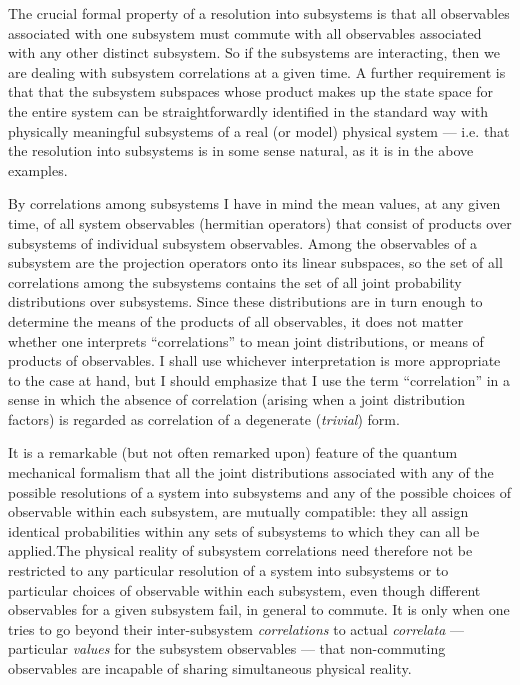 The crucial formal property of a resolution into subsystems is that
all observables associated with one subsystem must commute with all
observables associated with any other distinct subsystem.  So if the
subsystems are interacting, then we are dealing with subsystem
correlations at a given time.  A further requirement is that that the
subsystem subspaces whose product makes up the state space for the
entire system can be straightforwardly identified in the standard way
with physically meaningful subsystems of a real (or model) physical
system --- i.e.  that the resolution into subsystems is in some sense
natural, as it is in the above examples.\fn

By correlations among subsystems I have in mind the mean values, at any
given time, of all system observables (hermitian operators) that
consist of products over subsystems of individual subsystem
observables.  Among the observables of a subsystem are the projection
operators onto its linear subspaces, so the set of all correlations
among the subsystems contains the set of all joint probability
distributions over subsystems. Since these distributions are in turn
enough to determine the means of the products of all observables, it
does not matter whether one interprets ``correlations'' to mean joint
distributions, or means of products of observables.  I shall use
whichever interpretation is more appropriate to the case at hand, but
I should emphasize that I use the term ``correlation'' in a sense in
which the absence of correlation (arising when a joint distribution
factors) is regarded as correlation of a degenerate ({\it trivial\/})
form.

It is a remarkable (but not often remarked upon) feature of the
quantum mechanical formalism that all the joint distributions
associated with any of the possible resolutions of a system into
subsystems and any of the possible choices of observable within each
subsystem, are mutually compatible: they all assign identical
probabilities within any sets of subsystems to which they can all be
applied.\fn The physical reality of subsystem correlations need
therefore not be restricted to any particular resolution of a system
into subsystems or to particular choices of observable within each
subsystem, even though different observables for a given subsystem
fail, in general to commute.  It is only when one tries to go beyond
their inter-subsystem {\it correlations\/} to actual {\it correlata\/}
--- particular {\it values\/} for the subsystem observables --- that
non-commuting observables are incapable of sharing simultaneous
physical reality.\fn

